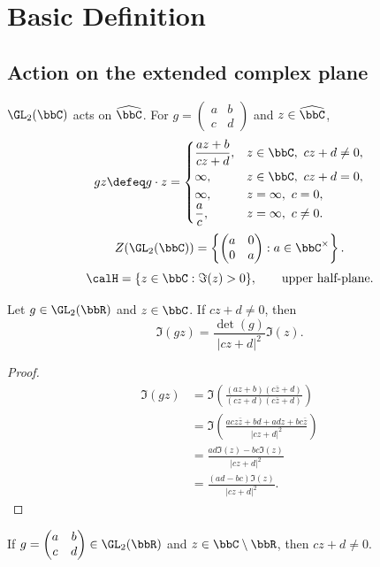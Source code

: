 \section{Basic Definition}

\subsection{Action on the extended complex plane}\label{Sec:MF_action}
$\GL_2(\bbC)$ acts on $\widehat{\bbC}$. For $g = \begin{pmatrix}a & b\\ c & d\end{pmatrix}$ and $z \in \widehat{\bbC}$,
\[
    gz \defeq g \cdot z = \begin{cases}
        \dfrac{az + b}{cz + d}, & z \in \bbC, \ cz + d \ne 0, \\[5pt]
        \infty, & z \in \bbC, \ cz + d = 0, \\
        \infty, & z = \infty, \ c = 0, \\
        \dfrac ac, & z = \infty, \ c \ne 0.
    \end{cases}
\]
\[
    Z(\GL_2(\bbC)) = \left\{\begin{pmatrix}a & 0\\ 0 & a\end{pmatrix} : a \in \bbC^\times\right\}.
\]
\[
    \calH = \{z \in \bbC : \Im(z) > 0\}, \qquad\text{upper half-plane}.
\]

\begin{proposition}\label{Prop:MF_imaginary_part}
    Let $g \in \GL_2(\bbR)$ and $z \in \bbC$. If $cz + d \ne 0$, then
    \[
        \Im(gz) = \frac{\det(g)}{|cz + d|^2}\Im(z).
    \]
\end{proposition}
\begin{proof}
    \begin{align*}
        \Im(gz)
        &= \Im\left(\frac{(az + b)(c\bar z + d)}{(cz + d)(c\bar z + d)}\right)\\
        &= \Im\left(\frac{ac z\bar z + bd + ad z + bc\bar z}{|cz + d|^2}\right)\\
        &= \frac{ad\Im(z) - bc\Im(z)}{|cz + d|^2}\\
        &= \frac{(ad - bc)\Im(z)}{|cz + d|^2}.
    \end{align*}
\end{proof}

\begin{lemma}\label{Lem:MF_denominator}
    If $g = \begin{pmatrix}a & b\\ c & d\end{pmatrix} \in \GL_2(\bbR)$ and $z \in \bbC \setminus \bbR$, then $cz + d \ne 0$.
\end{lemma}

